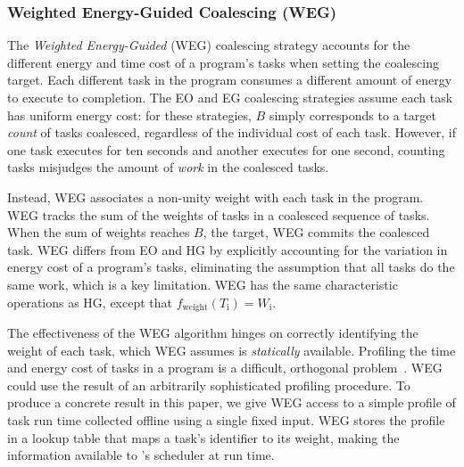 \subsubsection{Weighted Energy-Guided Coalescing (WEG)}
\label{subsec:energyTaskAware}
%
The \emph{Weighted Energy-Guided} (WEG) coalescing strategy accounts for the
different energy and time cost of a program's tasks when setting the coalescing
target.
%
Each different task in the program consumes a different amount of energy to
execute to completion.  
%
The EO and EG coalescing strategies assume each task has uniform energy cost:
for these strategies, $B$ simply corresponds to a target {\em count} of tasks
coalesced, regardless of the individual cost of each task.
%
However, if one task executes for ten seconds and another executes for one
second, counting tasks misjudges the amount of {\em work} in the coalesced
tasks.

Instead, WEG associates a non-unity weight with each task in the program. 
%
WEG tracks the sum of the weights of tasks in a coalesced sequence of tasks.
%
When the sum of weights reaches $B$, the target, WEG commits the coalesced
task.
%
WEG differs from EO and HG by explicitly accounting for the variation in energy
cost of a program's tasks, eliminating the assumption that all tasks do the
same work, which is a key limitation.
%
WEG has the same characteristic operations as HG, except that
$f_\text{weight}(T_\text{i}) = W_\text{i}$.

The effectiveness of the WEG algorithm hinges on correctly identifying the
weight of each task, which WEG assumes is {\em statically} available.
%
Profiling the time and energy cost of tasks in a program is a difficult,
orthogonal problem~\cite{cleancut_2018,baghsorkhi_cgo_2018}.
%
WEG could use the result of an arbitrarily sophisticated profiling procedure.
%
To produce a concrete result in this paper, we give WEG access to a simple
profile of task run time collected offline using a single fixed input.
%
WEG stores the profile in a lookup table that maps a task's identifier to its
weight, making the information available to \sys's scheduler at run time.